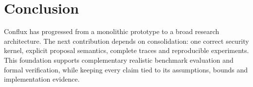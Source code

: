 \documentclass[11pt]{article}
\begin{document}
\section{Conclusion}
Conflux has progressed from a monolithic prototype to a broad research architecture. The next contribution depends on consolidation: one correct security kernel, explicit proposal semantics, complete traces and reproducible experiments. This foundation supports complementary realistic benchmark evaluation and formal verification, while keeping every claim tied to its assumptions, bounds and implementation evidence.



\end{document}

